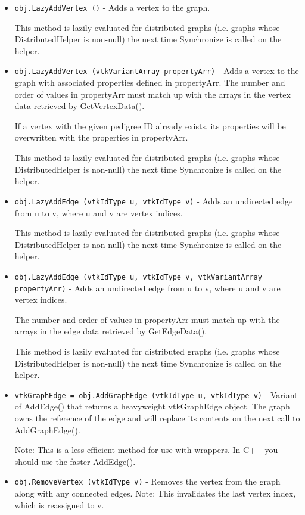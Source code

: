 \begin{itemize}
\item  \verb|obj.LazyAddVertex ()| -  Adds a vertex to the graph.

 This method is lazily evaluated for distributed graphs (i.e. graphs
 whose DistributedHelper is non-null) the next time Synchronize is
 called on the helper.

\item  \verb|obj.LazyAddVertex (vtkVariantArray propertyArr)| -  Adds a vertex to the graph with associated properties defined in
  propertyArr.
 The number and order of values in  propertyArr must match up with the
 arrays in the vertex data retrieved by GetVertexData().

 If a vertex with the given pedigree ID already exists, its properties will be
 overwritten with the properties in  propertyArr.

 This method is lazily evaluated for distributed graphs (i.e. graphs
 whose DistributedHelper is non-null) the next time Synchronize is
 called on the helper.

\item  \verb|obj.LazyAddEdge (vtkIdType u, vtkIdType v)| -  Adds an undirected edge from  u to  v,
 where  u and  v are vertex indices.

 This method is lazily evaluated for distributed graphs (i.e. graphs
 whose DistributedHelper is non-null) the next time Synchronize is
 called on the helper.

\item  \verb|obj.LazyAddEdge (vtkIdType u, vtkIdType v, vtkVariantArray propertyArr)| -  Adds an undirected edge from  u to  v,
 where  u and  v are vertex indices.

 The number and order of values in
  propertyArr must match up with the arrays in the edge data
 retrieved by GetEdgeData().

 This method is lazily evaluated for distributed graphs (i.e. graphs
 whose DistributedHelper is non-null) the next time Synchronize is
 called on the helper.

\item  \verb|vtkGraphEdge = obj.AddGraphEdge (vtkIdType u, vtkIdType v)| -  Variant of AddEdge() that returns a heavyweight  vtkGraphEdge object.
 The graph owns the reference of the edge and will replace
 its contents on the next call to AddGraphEdge().

 Note: This is a less efficient method for use with wrappers.
 In C++ you should use the faster AddEdge().

\item  \verb|obj.RemoveVertex (vtkIdType v)| -  Removes the vertex from the graph along with any connected edges.
 Note: This invalidates the last vertex index, which is reassigned to v.


\end{itemize}
